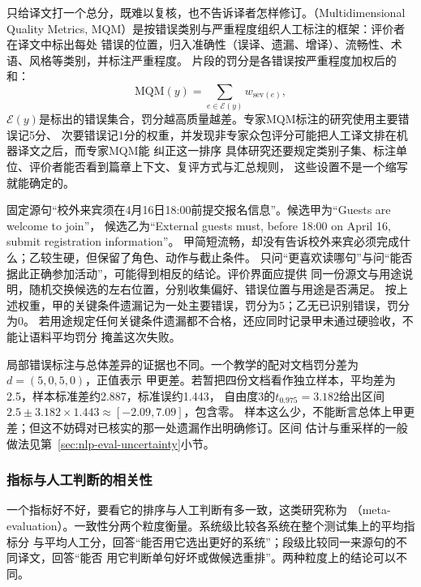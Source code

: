 只给译文打一个总分，既难以复核，也不告诉译者怎样修订。（Multidimensional
Quality Metrics, MQM）是按错误类别与严重程度组织人工标注的框架：评价者在译文中标出每处
错误的位置，归入准确性（误译、遗漏、增译）、流畅性、术语、风格等类别，并标注严重程度。
片段的罚分是各错误按严重程度加权后的和：
\begin{equation}
  \mathrm{MQM}(y)=\sum_{e\in\mathcal E(y)}w_{\mathrm{sev}(e)},
  \label{eq:nlp-generation-mqm}
\end{equation}
$\mathcal E(y)$是标出的错误集合，罚分越高质量越差。专家MQM标注的研究使用主要错误记5分、
次要错误记1分的权重，并发现非专家众包评分可能把人工译文排在机器译文之后，而专家MQM能
纠正这一排序
具体研究还要规定类别子集、标注单位、评价者能否看到篇章上下文、复评方式与汇总规则，
这些设置不是一个缩写就能确定的。

固定源句“校外来宾须在4月16日18:00前提交报名信息”。候选甲为“Guests are welcome to join”，
候选乙为“External guests must, before 18:00 on April 16, submit registration information”。
甲简短流畅，却没有告诉校外来宾必须完成什么；乙较生硬，但保留了角色、动作与截止条件。
只问“更喜欢读哪句”与问“能否据此正确参加活动”，可能得到相反的结论。评价界面应提供
同一份源文与用途说明，随机交换候选的左右位置，分别收集偏好、错误位置与用途是否满足。
按上述权重，甲的关键条件遗漏记为一处主要错误，罚分为5；乙无已识别错误，罚分为0。
若用途规定任何关键条件遗漏都不合格，还应同时记录甲未通过硬验收，不能让语料平均罚分
掩盖这次失败。

局部错误标注与总体差异的证据也不同。一个教学的配对文档罚分差为$d=(5,0,5,0)$，正值表示
甲更差。若暂把四份文档看作独立样本，平均差为2.5，样本标准差约2.887，标准误约1.443，
自由度3的$t_{0.975}=3.182$给出区间$2.5\pm3.182\times1.443\approx[-2.09,7.09]$，包含零。
样本这么少，不能断言总体上甲更差；但这不妨碍对已核实的那一处遗漏作出明确修订。区间
估计与重采样的一般做法见第~\ref{sec:nlp-eval-uncertainty}小节。

\subsubsection{指标与人工判断的相关性}
\label{sec:nlp-generation-meta-eval}

一个指标好不好，要看它的排序与人工判断有多一致，这类研究称为
（meta-evaluation）。一致性分两个粒度衡量。系统级比较各系统在整个测试集上的平均指标分
与平均人工分，回答“能否用它选出更好的系统”；段级比较同一来源句的不同译文，回答“能否
用它判断单句好坏或做候选重排”。两种粒度上的结论可以不同。

